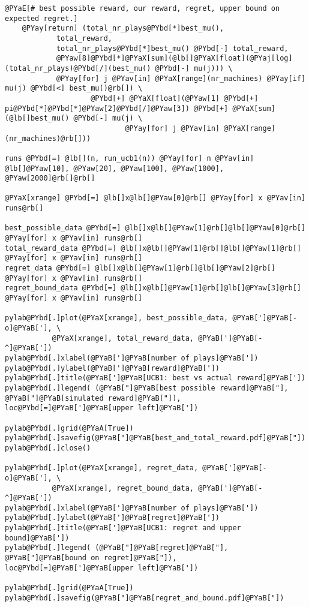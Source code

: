 \begin{Verbatim}[commandchars=@\[\]]
    @PYaE[# best possible reward, our reward, regret, upper bound on expected regret.]
    @PYay[return] (total_nr_plays@PYbd[*]best_mu(),
            total_reward,
            total_nr_plays@PYbd[*]best_mu() @PYbd[-] total_reward,
            @PYaw[8]@PYbd[*]@PYaX[sum](@lb[]@PYaX[float](@PYaj[log](total_nr_plays)@PYbd[/](best_mu() @PYbd[-] mu(j))) \
            @PYay[for] j @PYav[in] @PYaX[range](nr_machines) @PYay[if] mu(j) @PYbd[<] best_mu()@rb[]) \
                    @PYbd[+] @PYaX[float](@PYaw[1] @PYbd[+] pi@PYbd[*]@PYbd[*]@PYaw[2]@PYbd[/]@PYaw[3]) @PYbd[+] @PYaX[sum](@lb[]best_mu() @PYbd[-] mu(j) \
                            @PYay[for] j @PYav[in] @PYaX[range](nr_machines)@rb[]))

runs @PYbd[=] @lb[](n, run_ucb1(n)) @PYay[for] n @PYav[in] @lb[]@PYaw[10], @PYaw[20], @PYaw[100], @PYaw[1000], @PYaw[2000]@rb[]@rb[]

@PYaX[xrange] @PYbd[=] @lb[]x@lb[]@PYaw[0]@rb[] @PYay[for] x @PYav[in] runs@rb[]

best_possible_data @PYbd[=] @lb[]x@lb[]@PYaw[1]@rb[]@lb[]@PYaw[0]@rb[] @PYay[for] x @PYav[in] runs@rb[]
total_reward_data @PYbd[=] @lb[]x@lb[]@PYaw[1]@rb[]@lb[]@PYaw[1]@rb[] @PYay[for] x @PYav[in] runs@rb[]
regret_data @PYbd[=] @lb[]x@lb[]@PYaw[1]@rb[]@lb[]@PYaw[2]@rb[] @PYay[for] x @PYav[in] runs@rb[]
regret_bound_data @PYbd[=] @lb[]x@lb[]@PYaw[1]@rb[]@lb[]@PYaw[3]@rb[] @PYay[for] x @PYav[in] runs@rb[]

pylab@PYbd[.]plot(@PYaX[xrange], best_possible_data, @PYaB[']@PYaB[-o]@PYaB['], \
           @PYaX[xrange], total_reward_data, @PYaB[']@PYaB[-^]@PYaB['])
pylab@PYbd[.]xlabel(@PYaB[']@PYaB[number of plays]@PYaB['])
pylab@PYbd[.]ylabel(@PYaB[']@PYaB[reward]@PYaB['])
pylab@PYbd[.]title(@PYaB[']@PYaB[UCB1: best vs actual reward]@PYaB['])
pylab@PYbd[.]legend( (@PYaB["]@PYaB[best possible reward]@PYaB["], @PYaB["]@PYaB[simulated reward]@PYaB["]), loc@PYbd[=]@PYaB[']@PYaB[upper left]@PYaB['])

pylab@PYbd[.]grid(@PYaA[True])
pylab@PYbd[.]savefig(@PYaB["]@PYaB[best_and_total_reward.pdf]@PYaB["])
pylab@PYbd[.]close()

pylab@PYbd[.]plot(@PYaX[xrange], regret_data, @PYaB[']@PYaB[-o]@PYaB['], \
           @PYaX[xrange], regret_bound_data, @PYaB[']@PYaB[-^]@PYaB['])
pylab@PYbd[.]xlabel(@PYaB[']@PYaB[number of plays]@PYaB['])
pylab@PYbd[.]ylabel(@PYaB[']@PYaB[regret]@PYaB['])
pylab@PYbd[.]title(@PYaB[']@PYaB[UCB1: regret and upper bound]@PYaB['])
pylab@PYbd[.]legend( (@PYaB["]@PYaB[regret]@PYaB["], @PYaB["]@PYaB[bound on regret]@PYaB["]), loc@PYbd[=]@PYaB[']@PYaB[upper left]@PYaB['])

pylab@PYbd[.]grid(@PYaA[True])
pylab@PYbd[.]savefig(@PYaB["]@PYaB[regret_and_bound.pdf]@PYaB["])
\end{Verbatim}
